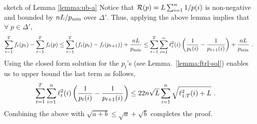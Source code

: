 \begin{proofarg}{sketch of Lemma  \ref{lemma:ub-a} }
Notice that $\mathcal{R}(p) =  L \sum_{i=1}^n {1}/{p(i)}$ is non-negative and bounded by $nL/p_{\text{min}}$ over $\Delta'$. Thus,  applying the above lemma implies that $\forall \; p\in\Delta'$,
\begin{equation*}
\sum_{t=1}^T f_t(p_t)   - \sum_{t=1}^T f_t(p)  \leq  \sum_{t=1}^T \left( f_t(p_t)- f_t(p_{t+1}) \right) +  \frac{nL}{p_{\text{min}}}  \leq \sum_{t=1}^T \sum_{i=1}^n \ell_t^2(i) \left( \frac{1}{p_t(i)}  - \frac{1}{p_{t+1}(i)}\right) + \frac{nL}{p_{\text{min}}}~.
\end{equation*}
Using the closed form solution for the  $p_t$'s (see Lemma.~\ref{lemma:ftrl-sol}) enables us to upper bound the last term as follows,
\begin{align} \label{eq:frtl-ub0}
\sum_{t=1}^T \sum_{i=1}^n \ell_t^2(i) \left( \frac{1}{p_t(i)}  - \frac{1}{p_{t+1}(i)}\right)
& \leq 
22n\sqrt{L} \sum_{i=1}^n \sqrt{ \ell_{1:T}^2(i) +L}~.
\end{align}
Combining the above with $\sqrt{a+b}\leq \sqrt{a}+\sqrt{b}$ completes the proof.
\end{proofarg}
